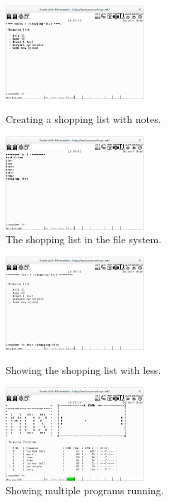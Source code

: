 \documentclass[a4paper]{report}
\begin{document}
\begin{figure}[ht]
\centering
\begin{minipage}{.5\textwidth}
  \centering
  \includegraphics[width=195px]{demoimages/creating-a-shopping-list}
  \caption{Creating a shopping list with notes.}
  \label{fig:demo-notes}
\end{minipage}%
\begin{minipage}{.5\textwidth}
  \centering
  \includegraphics[width=195px]{demoimages/shopping-list-on-disk}
  \caption{The shopping list in the file system.}
  \label{fig:demo-ls}
\end{minipage}
\end{figure}


\begin{figure}[ht]
\centering
\begin{minipage}{.5\textwidth}
  \centering
  \includegraphics[width=195px]{demoimages/less-shopping-list}
  \caption{Showing the shopping list with less.}
  \label{fig:demo-less}
\end{minipage}%
\begin{minipage}{.5\textwidth}
  \centering
  \includegraphics[width=195px]{demoimages/multiple-running-programs}
  \caption{Showing multiple programs running.}
  \label{fig:demo-multi}
\end{minipage}
\end{figure}
\clearpage
\end{document}
